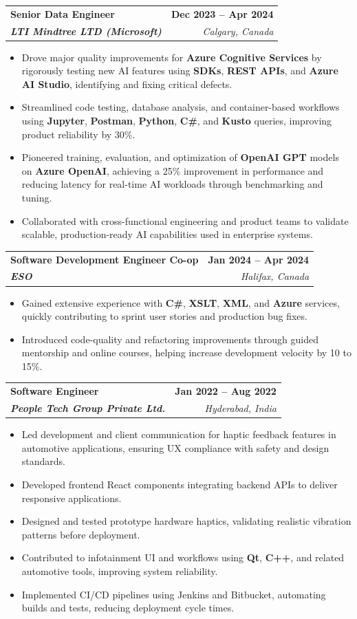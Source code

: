 \documentclass[letterpaper,11pt]{article}
\makeatletter
\newcommand{\resumeItem}[1]{
  \item\small{
    {#1 \vspace{-2pt}}
  }
}
\newcommand{\resumeSubheading}[4]{
  \vspace{-2pt}\item
    \begin{tabular*}{1.0\textwidth}[t]{l@{\extracolsep{\fill}}r}
      \textbf{#1} & \textbf{\small #2} \\
      \textit{\small#3} & \textit{\small #4} \\
    \end{tabular*}\vspace{-7pt}
}
\newcommand{\resumeItemListStart}{\begin{itemize}}
\newcommand{\resumeItemListEnd}{\end{itemize}\vspace{-5pt}}
\makeatother
\begin{document}
    \resumeSubheading
      {\textbf{Senior Data Engineer}}{\textbf{Dec 2023 -- Apr 2024}}
      {\textbf{LTI Mindtree LTD (Microsoft)}}{Calgary, Canada}
      \resumeItemListStart
        \resumeItem{Drove major quality improvements for \textbf{Azure Cognitive Services} by rigorously testing new AI features using \textbf{SDKs}, \textbf{REST APIs}, and \textbf{Azure AI Studio}, identifying and fixing critical defects.}
        \resumeItem{Streamlined code testing, database analysis, and container-based workflows using \textbf{Jupyter}, \textbf{Postman}, \textbf{Python}, \textbf{C\#}, and \textbf{Kusto} queries, improving product reliability by 30\%.}
        \resumeItem{Pioneered training, evaluation, and optimization of \textbf{OpenAI GPT} models on \textbf{Azure OpenAI}, achieving a 25\% improvement in performance and reducing latency for real-time AI workloads through benchmarking and tuning.}
        \resumeItem{Collaborated with cross-functional engineering and product teams to validate scalable, production-ready AI capabilities used in enterprise systems.}
      \resumeItemListEnd
    
    \resumeSubheading
      {\textbf{Software Development Engineer Co-op}}{\textbf{Jan 2024 -- Apr 2024}}
      {\textbf{ESO}}{Halifax, Canada}
      \resumeItemListStart
        \resumeItem{Gained extensive experience with \textbf{C\#}, \textbf{XSLT}, \textbf{XML}, and \textbf{Azure} services, quickly contributing to sprint user stories and production bug fixes.}
        \resumeItem{Introduced code-quality and refactoring improvements through guided mentorship and online courses, helping increase development velocity by 10 to 15\%.}
      \resumeItemListEnd

    \resumeSubheading
      {\textbf{Software Engineer}}{\textbf{Jan 2022 -- Aug 2022}}
      {\textbf{People Tech Group Private Ltd.}}{Hyderabad, India}
      \resumeItemListStart
        \resumeItem{Led development and client communication for haptic feedback features in automotive applications, ensuring UX compliance with safety and design standards.}
        \resumeItem{Developed frontend React components integrating backend APIs to deliver responsive applications.}
        \resumeItem{Designed and tested prototype hardware haptics, validating realistic vibration patterns before deployment.}
        \resumeItem{Contributed to infotainment UI and workflows using \textbf{Qt}, \textbf{C++}, and related automotive tools, improving system reliability.}
        \resumeItem{Implemented CI/CD pipelines using Jenkins and Bitbucket, automating builds and tests, reducing deployment cycle times.}
      \resumeItemListEnd
\end{document}

